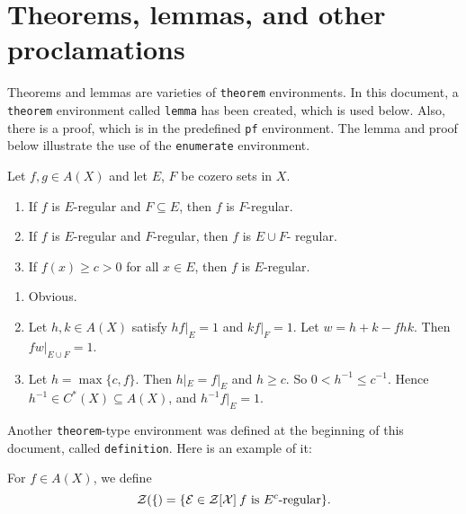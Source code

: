 \section{Theorems, lemmas, and other proclamations}

Theorems and lemmas are varieties of \verb+theorem+ environments.  In this
document, a \verb+theorem+ environment called \verb+lemma+ has been created,
which is used below. Also, there is a  proof, which is in the predefined
\verb+pf+ environment.  The lemma and proof below illustrate the use of 
the \verb+enumerate+ environment. 

\begin{lemma}
Let $f, g\in  A(X)$ and let $E$, $F$ be cozero
sets in $X$.
\begin{enumerate}
\item If $f$ is $E$-regular and $F\subseteq E$, then $f$ is $F$-regular.

\item If $f$ is $E$-regular and $F$-regular, then $f$ is $E\cup F$-%
regular.

\item If $f(x)\ge c>0$ for all $x\in E$, then $f$ is $E$-regular.

\end{enumerate}
\end{lemma}

\begin{pf}
\begin{enumerate}

\item  Obvious.

\item Let $h, k\in A(X)$ satisfy $hf|_E=1$ and $kf|_F=1$. Let
$w=h+k-fhk$. Then $fw|_{E\cup F}=1$.

\item Let $h=\max\{c,f\}$. Then $h|_E=f|_E$ and $h\ge c$. So $0<h^{-1}
\le c^{-1}$. Hence $h^{-1} \in C^*(X)\subseteq A(X)$, and 
$h^{-1} f|_E=1$. 

\end{enumerate}
\end{pf}

Another \verb+theorem+-type environment was defined at the beginning of this
document, called \verb+definition+. Here is an example of it:

\begin{definition}
For $f\in A(X)$, we define
\begin{equation}
\cal Z (f)=\{E\in Z[X]\: \text{$f$ is $E^c$-regular}\}.
\end{equation}
\end{definition}

